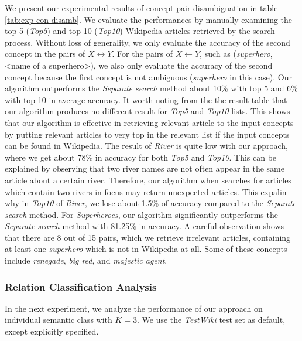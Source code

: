 We present our experimental results of concept pair disambiguation in
table \ref{tab:exp-con-disamb}. We evaluate the performances by
manually examining the top 5 ({\em Top5}) and top 10 ({\em Top10})
Wikipedia articles retrieved by the search process. Without loss of
generality, we only evaluate the accuracy of the second concept in the
pairs of $X \leftrightarrow Y$. For the pairs of $X \leftarrow Y$,
such as ({\em superhero}, <name of a superhero>), we also only
evaluate the accuracy of the second concept because the first concept
is not ambiguous ({\em superhero} in this case). Our algorithm
outperforms the {\em Separate search} method about 10\% with top 5 and
6\% with top 10 in average accuracy. It worth noting from the the
result table that our algorithm produces no different result for {\em
  Top5} and {\em Top10} lists. This shows that our algorithm is
effective in retrieving relevant article to the input concepts by
putting relevant articles to very top in the relevant list if the
input concepts can be found in Wikipedia. The result of {\em River} is
quite low with our approach, where we get about 78\% in accuracy for
both {\em Top5} and {\em Top10}. This can be explained by observing
that two river names are not often appear in the same article about a
certain river. Therefore, our algorithm when searches for articles
which contain two rivers in focus may return unexpected articles. This
expalin why in {\em Top10} of {\em River}, we lose about 1.5\% of
accuracy compared to the {\em Separate search} method.
For {\em Superheroes}, our algorithm significantly outperforms the
{\em Separate search} method with 81.25\% in accuracy. A careful
observation shows that there are 8 out of 15 pairs, which we retrieve
irrelevant articles, containing at least one {\em superhero} which is
not in Wikipedia at all. Some of these concepts include {\em
  renegade}, {\em big red}, and {\em majestic agent}.

\subsubsection{Relation Classification Analysis}

In the next experiment, we analyze the performance of our approach on
individual semantic class with $K=3$. We use the {\em TestWiki} test
set as default, except explicitly specified.

\vspace*{2 mm}

